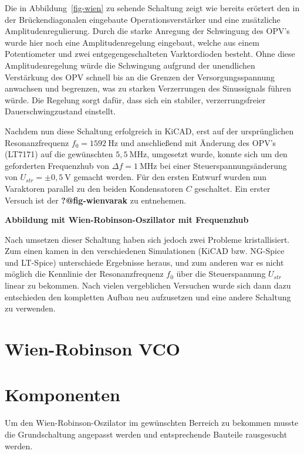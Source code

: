 \documentclass[
  ngerman,
  11pt,
  a4paper,
  DIV=11,
  twoside]{scrreprt}
\begin{document}
Die in Abbildung~\ref{fig-wien} zu sehende Schaltung zeigt wie bereits
erörtert den in der Brückendiagonalen eingebaute Operationsverstärker
und eine zusätzliche Amplitudenregulierung. Durch die starke Anregung
der Schwingung des OPV's wurde hier noch eine Amplitudenregelung
eingebaut, welche aus einem Potentiometer und zwei entgegengeschalteten
Varktordioden besteht. Ohne diese Amplitudenregelung würde die
Schwingung aufgrund der unendlichen Verstärkung des OPV schnell bis an
die Grenzen der Versorgungsspannung anwachsen und begrenzen, was zu
starken Verzerrungen des Sinussignals führen würde. Die Regelung sorgt
dafür, dass sich ein stabiler, verzerrungsfreier Dauerschwingzustand
einstellt.

Nachdem nun diese Schaltung erfolgreich in KiCAD, erst auf der
ursprünglichen Resonanzfrequenz \(f_0=1592~\text{Hz}\) und anschließend
mit Änderung des OPV's (LT7171) auf die gewünschten \(5,5~\text{MHz}\),
umgesetzt wurde, konnte sich um den geforderten Frequenzhub von
\(\Delta f=1~\text{MHz}\) bei einer Steuerspannungsänderung von
\(U_{str}=\pm 0,5~\text{V}\) gemacht werden. Für den ersten Entwurf
wurden nun Varaktoren parallel zu den beiden Kondensatoren \(C\)
geschaltet. Ein erster Versuch ist der \textbf{?@fig-wienvarak} zu
entnehemen.

\textbf{Abbildung mit Wien-Robinson-Oszillator mit Frequenzhub}

Nach umsetzen dieser Schaltung haben sich jedoch zwei Probleme
kristallisiert. Zum einen kamen in den verschiedenen Simulationen (KiCAD
bzw. NG-Spice und LT-Spice) unterschiede Ergebnisse heraus, und zum
anderen war es nicht möglich die Kennlinie der Resonanzfrequenz \(f_0\)
über die Steuerspannung \(U_{str}\) linear zu bekommen. Nach vielen
vergeblichen Versuchen wurde sich dann dazu entschieden den kompletten
Aufbau neu aufzusetzen und eine andere Schaltung zu verwenden.

\section{Wien-Robinson VCO}\label{wien-robinson-vco}

\section{Komponenten}\label{komponenten}

Um den Wien-Robinson-Oszilator im gewünschten Berreich zu bekommen
musste die Grundschaltung angepasst werden und entsprechende Bauteile
rausgesucht werden.
\end{document}
